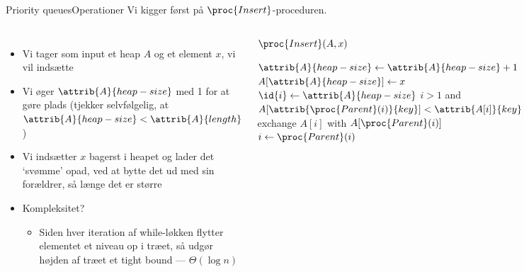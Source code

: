 \documentclass[aspectratio=1610]{beamer}
\begin{document}
\begin{frame}{Priority queues}{Operationer}
    Vi kigger først på $\proc{Insert}$-proceduren.

    \begin{columns}
        \small
        \begin{itemize}[<+->]
            \item Vi tager som input et heap $A$ og et element $x$, vi vil
                indsætte
            \item Vi øger $\attrib{A}{heap-size}$ med 1 for at gøre plads
                (tjekker selvfølgelig, at $\attrib{A}{heap-size} <
                \attrib{A}{length}$)
            \item Vi indsætter $x$ bagerst i heapet og lader det `svømme' opad,
                ved at bytte det ud med sin forældrer, så længe det er større
            \item Kompleksitet?
                \begin{itemize}
                    \item Siden hver iteration af while-løkken flytter elementet
                        et niveau op i træet, så udgør højden af træet et tight
                        bound --- $\Theta(\log n)$
                \end{itemize}
        \end{itemize}
    
        \begin{block}{$\proc{Insert}(A,x)$}
            \small
            
            \vspace{-\abovedisplayskip}
            \begin{codebox}
                \Procname{$\proc{}$}
                \li $\attrib{A}{heap-size} \gets \attrib{A}{heap-size} + 1$
                \li $A[\attrib{A}{heap-size}] \gets x$
                \li $\id{i} \gets \attrib{A}{heap-size}$
                \li \While $i > 1$ and $A[\attrib{\proc{Parent}(i)}{key}] <
                    \attrib{A[i]}{key}$
                \li \Do
                        exchange $A[i]$ with $A[\proc{Parent}(i)]$
                \li     $i \gets \proc{Parent}(i)$
                    \End
            \end{codebox}
        \end{block}
    \end{columns}
\end{frame}
\end{document}
